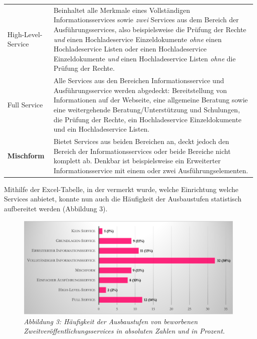 \documentclass[a4paper,
fontsize=11pt,
oneside,
numbers=noperiodatend,
parskip=half-,
bibliography=totoc,
final
]{scrartcl}
\begin{document}
\begin{table}[h!]
\begin{tabular}{lp{9cm}}
    High-Level-Service                      & Beinhaltet alle Merkmale eines Vollständigen Informationsservices sowie \textit{zwei} Services aus dem Bereich der Ausführungsservices, also beispielsweise die Prüfung der Rechte \textit{und} einen Hochladeservice Einzeldokumente \textit{ohne} einen Hochladeservice Listen oder einen Hochladeservice Einzeldokumente \textit{und} einen Hochladeservice Listen \textit{ohne} die Prüfung der Rechte. \\
    Full Service                                 & Alle Services aus den Bereichen Informationsservice und Ausführungsservice werden abgedeckt: Bereitstellung von Informationen auf der Webseite, eine allgemeine Beratung sowie eine weitergehende Beratung/Unterstützung und Schulungen, die Prüfung der Rechte, ein Hochladeservice Einzeldokumente und ein Hochladeservice Listen.                           \\
    \midrule
    \textbf{Mischform}                                  & Bietet Services aus beiden Bereichen an, deckt jedoch den Bereich der Informationsservices oder beide Bereiche nicht komplett ab. Denkbar ist beispielsweise ein Erweiterter Informationsservice mit einem oder zwei Ausführungselementen.  \\                                                                                                                                                                                                                                                                                                                                                    \bottomrule
    \end{tabular}
\end{table}

Mithilfe der Excel-Tabelle, in der vermerkt wurde, welche Einrichtung
welche Services anbietet, konnte nun auch die Häufigkeit der
Ausbaustufen statistisch aufbereitet werden (Abbildung 3).

\begin{figure}[h!]
\centering
\includegraphics[width=.9\textwidth]{img/abb3.png}
\caption{\textit{Abbildung 3: Häufigkeit der Ausbaustufen von beworbenen
Zweitveröffentlichungsservices in absoluten Zahlen und in Prozent.}}
\end{figure}
\end{document}
